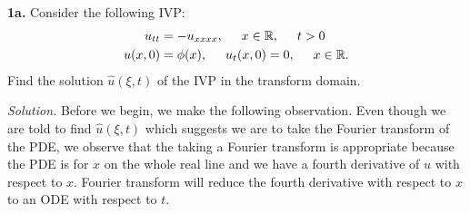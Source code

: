 \documentclass{article}
\begin{document}
\setlength{\parindent}{0cm}   %



\textbf{1a.} Consider the following IVP:
\begin{align*}
u_{tt} &= -u_{xxxx}, \hspace{5mm} x\in \mathbb{R},\hspace{5mm} t>0 \\
u(x,0) &= \phi(x), \hspace{5mm} u_t(x,0)= 0, \hspace{5mm} x\in\mathbb{R}.
\end{align*}
Find the solution \(\hat u(\xi,t) \) of the IVP in the transform domain. 

\vspace{3mm}
\textit{Solution.} Before we begin, we make the following observation. Even though we are told to find \(\hat u(\xi,t)\) which suggests we are to take the Fourier transform of the PDE, we observe that the taking a Fourier transform is appropriate because the PDE is for \(x\) on the whole real line and we have a fourth derivative of \(u\) with respect to \(x\). Fourier transform will reduce the fourth derivative with respect to \(x\) to an ODE with respect to \(t\). 

\vspace{2mm}
\end{document}

